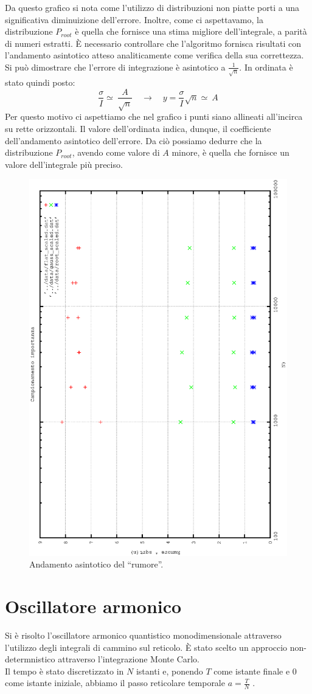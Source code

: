 Da questo grafico si nota come l'utilizzo di distribuzioni non piatte porti a una significativa diminuizione dell'errore. Inoltre, come ci aspettavamo,
la distribuzione $P_{root}$ è quella che fornisce una stima migliore dell'integrale, a parità di numeri estratti.
È necessario controllare che l'algoritmo fornisca risultati con l'andamento asintotico atteso analiticamente come verifica della sua correttezza.
Si può dimostrare che l'errore di integrazione è asintotico a $ \frac{1}{\sqrt{n}}$. In ordinata è stato quindi posto:
$$
 \frac{ \sigma}{I} \simeq  \ \frac{A}{\sqrt{n}} \quad  \longrightarrow \quad y = \frac{ \sigma}{I} \sqrt{n}\simeq \ A 
$$
 Per questo motivo ci aspettiamo che nel grafico i punti siano allineati all'incirca su rette orizzontali. Il valore dell'ordinata indica, dunque,
 il coefficiente dell'andamento asintotico dell'errore. Da ciò possiamo dedurre che la distribuzione $P_{root}$, avendo come valore di $A$ minore,
 è quella che fornisce un valore dell'integrale più preciso.
\begin{figure}[h]
\includegraphics[width=0.6\columnwidth,angle=-90]{importanza_noise.eps}
\caption{Andamento asintotico del ``rumore''.}
\end{figure}


\chapter{Oscillatore armonico}
Si è risolto l'oscillatore armonico quantistico monodimensionale attraverso l'utilizzo degli integrali di cammino sul reticolo.
È stato scelto un approccio non-determnistico attraverso l'integrazione Monte Carlo.\\
Il tempo è stato discretizzato in $N$ istanti e, ponendo $T$ come istante finale e $0$ come istante iniziale,
abbiamo il passo reticolare temporale $ a = \frac{T}{N}$ .
